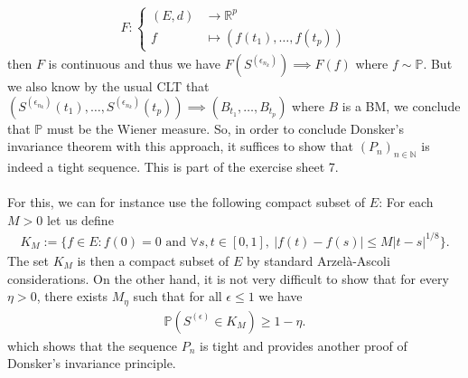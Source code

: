 \documentclass[../mainfile.tex]{subfiles}
\begin{document}
\begin{align*}
F: \begin{cases} (E,d) & \longrightarrow \mathbb{R}^p \\
f & \longmapsto (f(t_1), \dots , f(t_p))
 \end{cases}
\end{align*}
then $F$ is continuous and thus we have $F(S^{( \epsilon_{n_k})}) \implies F(f)$ where $f \sim \mathbb{P}$. But we also know by the usual CLT that $(S^{( \epsilon_{n_k})}(t_1), \dots , S^{( \epsilon_{n_k})}(t_p)) \implies (B_{t_1}, \dots , B_{t_p})$ where $B$ is a BM, we conclude that $\mathbb{P}$  must be the Wiener measure. 
\newpage
So, in order to conclude Donsker's invariance theorem with this approach, it suffices to show that $(P_n)_{n \in \mathbb{N}}$ is indeed a tight sequence. This is part of the exercise sheet 7. \\
\\
For this, we can for instance use the following compact subset of $E$: For each $M>0$ let us define
\begin{align*}
K_M:= \{ f \in E : f(0)=0 \text{ and } \forall s,t \in [0,1], \ |f(t)-f(s)| \leq M |t-s|^{1/8}\}.
\end{align*}
The set $K_M$ is then a compact subset of $E$ by standard Arzelà-Ascoli considerations. On the other hand, it is not very difficult to show that for every $\eta >0$, there exists $M_\eta$ such that for all $\epsilon \leq 1$ we have  
\begin{align*}
\mathbb{P}(S^{( \epsilon)} \in K_M) \geq 1 - \eta. 
\end{align*}
which shows that the sequence $P_n$ is tight and provides another proof of Donsker's invariance principle. 
\end{document}

